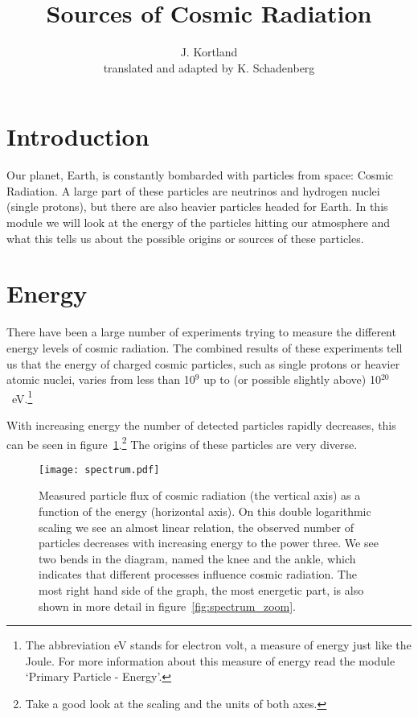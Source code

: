 



\author{J. Kortland \\ translated and adapted by K. Schadenberg}
\date{}
\title{Sources of Cosmic Radiation}



\maketitle

\section{Introduction}
Our planet, Earth, is constantly bombarded with particles from space: Cosmic Radiation. A large part of these particles are neutrinos and hydrogen nuclei (single protons), but there are also heavier particles headed for Earth.
In this module we will look at the energy of the particles hitting our atmosphere and what this tells us about the possible origins or sources of these particles.

\section{Energy}
There have been a large number of experiments trying to measure the different energy levels of cosmic radiation. The combined results of these experiments tell us that the energy of charged cosmic particles, such as single protons or heavier atomic nuclei, varies from less than 10$^9$ up to (or possible slightly above) 10$^{20}$~eV.\footnote{The abbreviation eV stands for electron volt, a measure of energy just like the Joule. For more information about this measure of energy read the module `Primary Particle - Energy'.}

With increasing energy the number of detected particles rapidly decreases, this can be seen in figure~\ref{fig:spectrum}.\footnote{Take a good look at the scaling and the units of both axes.} The origins of these particles are very diverse.

\begin{figure}\begin{center}
\texttt{[image: spectrum.pdf]}
\caption{Measured particle flux of cosmic radiation (the vertical axis) as a function of the energy (horizontal axis). On this double logarithmic scaling we see an almost linear relation, the observed number of particles decreases with increasing energy to the power three. We see two bends in the diagram, named the knee and the ankle, which indicates that different processes influence cosmic radiation. The most right hand side of the graph, the most energetic part, is also shown in more detail in figure~\ref{fig:spectrum_zoom}.}\label{fig:spectrum}
\end{center}\end{figure}

